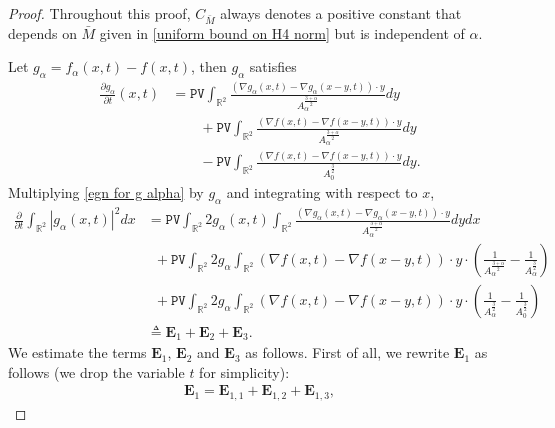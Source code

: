 \documentclass[reqno]{amsart}%
\theoremstyle{definition}
\theoremstyle{remark}
\numberwithin{equation}{section}
\newcommand{\0}{\mathbf{0}}
\newcommand{\1}{\mathbf{1}}
\newcommand{\PV}{\texttt{PV}}
\numberwithin{equation}{section}
\numberwithin{theorem}{section}
\numberwithin{figure}{section}
\begin{document}
\begin{proof}
Throughout this proof, $C_{\bar{M}}$ always denotes a positive constant that depends on $\bar{M}$ given in \eqref{uniform bound on H4 norm} but is independent of $\alpha$. 

Let $g_{\alpha}=f_{\alpha}(x, t)-f(x, t)$, then $g_{\alpha}$ satisfies
\begin{equation}\label{egn for g alpha}
\begin{split}
\frac{\partial g_{\alpha}}{\partial t}(x, t) & = \PV \int_{\mathbb{R}^{2}} \frac{\left(\nabla g_{\alpha}(x, t)-\nabla g_{\alpha}(x-y, t)\right) \cdot y}{A_{\alpha}^{\frac{3+\alpha}{2}}} d y \\
& \qquad+ \PV \int_{\mathbb{R}^{2}} \frac{(\nabla f(x, t)-\nabla f(x-y, t)) \cdot y}{A_{\alpha}^{\frac{3+\alpha}{2}}} d y \\
& \qquad- \PV \int_{\mathbb{R}^{2}} \frac{(\nabla f(x, t)-\nabla f(x-y, t)) \cdot y}{A_{0}^{\frac{3}{2}}} d y. 
\end{split}
\end{equation} 
Multiplying \eqref{egn for g alpha} by $g_{\alpha}$ and integrating with respect to $x$,
\begin{equation*} 
\begin{split}
 \frac{\partial}{\partial t} \int_{\mathbb{R}^{2}}\left|g_{\alpha}(x, t)\right|^{2} d x&=\PV \int_{\mathbb{R}^{2}} 2g_{\alpha}(x, t) \int_{\mathbb{R}^{2}} \frac{\left(\nabla g_{\alpha}(x, t)-\nabla g_{\alpha}(x-y, t)\right) \cdot y}{A_{\alpha}^{\frac{3+\alpha}{2}}} d y d x \\
&\,\,\,+\PV \int_{\mathbb{R}^{2}} 2g_{\alpha} \int_{\mathbb{R}^{2}}(\nabla f(x, t)-\nabla f(x-y, t)) \cdot y \cdot\left(\frac{1}{A_{\alpha}^{\frac{3+\alpha}{2}}}-\frac{1}{A_{\alpha}^\frac{3}{2}}\right) \\
&\,\,\,+\PV \int_{\mathbb{R}^{2}} 2g_{\alpha} \int_{\mathbb{R}^{2}}(\nabla f(x, t)-\nabla f(x-y, t)) \cdot y \cdot\left(\frac{1}{A_{\alpha}^\frac{3}{2}}-\frac{1}{A_{0}^\frac{3}{2}}\right) \\
&\triangleq \mathbf{E}_{1}+\mathbf{E}_{2}+\mathbf{E}_{3}. 
\end{split}
\end{equation*}
We estimate the terms $\mathbf{E}_{1}$, $\mathbf{E}_{2}$ and $\mathbf{E}_{3}$ as follows. First of all, we rewrite $\mathbf{E}_{1}$ as follows (we drop the variable $t$ for simplicity):
\begin{align*}
\mathbf{E}_{1}=\mathbf{E}_{1,1}+\mathbf{E}_{1,2}+\mathbf{E}_{1,3},
\end{align*}

\end{proof}
\end{document}
